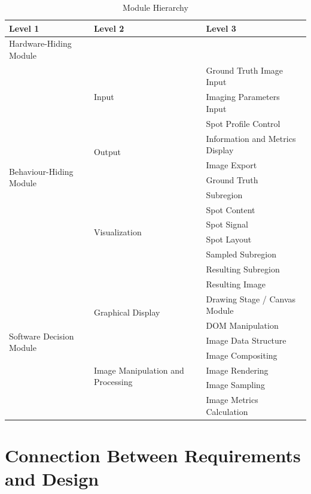 \documentclass[12pt, titlepage]{article}
\begin{document}
\begin{table}[h!]
\centering
\begin{tabular}{p{} p{} p{}}
\toprule
\textbf{Level 1} & \textbf{Level 2} & \textbf{Level 3}\\
\midrule

{Hardware-Hiding Module} & ~ \\
\midrule

\multirow{13}{0.3\textwidth}{Behaviour-Hiding Module}
& \multirow{3}{0.3\textwidth}{Input}
  & Ground Truth Image Input \\
  && Imaging Parameters Input \\
  && Spot Profile Control \\
  \cline{2-3}
& \multirow{2}{0.3\textwidth}{Output}
  & Information and Metrics Display \\
  && Image Export\\
  \cline{2-3}
& \multirow{8}{0.3\textwidth}{Visualization}
  & Ground Truth \\
  && Subregion \\
  && Spot Content \\
  && Spot Signal \\
  && Spot Layout \\
  && Sampled Subregion \\
  && Resulting Subregion \\
  && Resulting Image \\
\midrule

\multirow{6}{0.3\textwidth}{Software Decision Module}
& \multirow{2}{0.3\textwidth}{Graphical Display}
  & Drawing Stage / Canvas Module \\
  && DOM Manipulation \\
  \cline{2-3}
& \multirow{5}{0.3\textwidth}{Image Manipulation and Processing}
  & Image Data Structure \\
  && Image Compositing \\
  && Image Rendering \\
  && Image Sampling \\
  && Image Metrics Calculation \\
\bottomrule

\end{tabular}
\caption{Module Hierarchy}
\label{TblMH}
\end{table}

\section{Connection Between Requirements and Design} \label{SecConnection}
\end{document}
